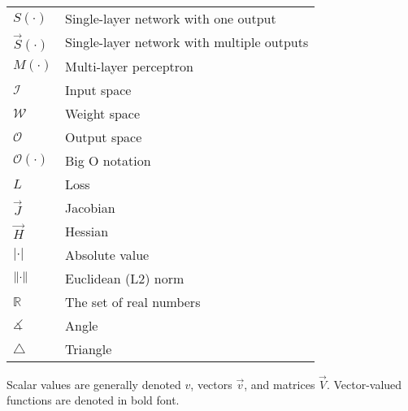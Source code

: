 \begin{table}[h!]
\begin{tabular}{l|l}
        $S(\cdot)$ & Single-layer network with one output \\
        $\vec{S}(\cdot)$ & Single-layer network with multiple outputs \\
        $M(\cdot)$ & Multi-layer perceptron \\
        $\mathcal{I}$ & Input space \\
        $\mathcal{W}$ & Weight space \\
        $\mathcal{O}$ & Output space \\
        $\mathcal{O}(\cdot)$ & Big O notation \\
        $L$ & Loss \\
        $\vec{J}$ & Jacobian \\
        $\vec{H}$ & Hessian \\
        $|\cdot|$ & Absolute value \\
        $\left\lVert\cdot\right\rVert$ & Euclidean (L2) norm \\
        $\mathbb{R}$ & The set of real numbers \\
        $\measuredangle$ & Angle \\
        $\triangle$ & Triangle
    \end{tabular}
\end{table}

\noindent
Scalar values are generally denoted $v$, vectors $\vec{v}$, and matrices $\vec{V}$.
Vector-valued functions are denoted in bold font.